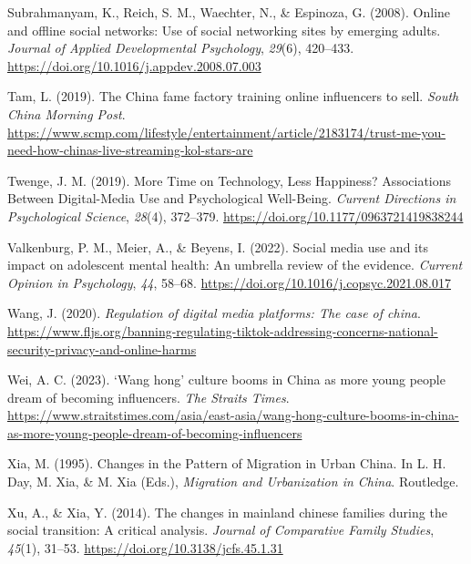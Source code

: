 \documentclass[
  letterpaper,
  DIV=11,
  numbers=noendperiod]{scrartcl}
\newlength{\cslhangindent}
\newenvironment{CSLReferences}[2] %
 {\begin{list}{}{%
  \setlength{\itemindent}{0pt}
  \setlength{\leftmargin}{0pt}
  \setlength{\parsep}{0pt}
  \ifodd #1
   \setlength{\leftmargin}{\cslhangindent}
   \setlength{\itemindent}{-1\cslhangindent}
  \fi
  \setlength{\itemsep}{#2\baselineskip}}}
 {\end{list}}
\begin{document}
\begin{CSLReferences}{1}{0}
Subrahmanyam, K., Reich, S. M., Waechter, N., \& Espinoza, G. (2008).
Online and offline social networks: Use of social networking sites by
emerging adults. \emph{Journal of Applied Developmental Psychology},
\emph{29}(6), 420--433.
\url{https://doi.org/10.1016/j.appdev.2008.07.003}

Tam, L. (2019). The China fame factory training online influencers to
sell. \emph{South China Morning Post}.
\url{https://www.scmp.com/lifestyle/entertainment/article/2183174/trust-me-you-need-how-chinas-live-streaming-kol-stars-are}

Twenge, J. M. (2019). More Time on Technology, Less Happiness?
Associations Between Digital-Media Use and Psychological Well-Being.
\emph{Current Directions in Psychological Science}, \emph{28}(4),
372--379. \url{https://doi.org/10.1177/0963721419838244}

Valkenburg, P. M., Meier, A., \& Beyens, I. (2022). Social media use and
its impact on adolescent mental health: An umbrella review of the
evidence. \emph{Current Opinion in Psychology}, \emph{44}, 58--68.
\url{https://doi.org/10.1016/j.copsyc.2021.08.017}

Wang, J. (2020). \emph{Regulation of digital media platforms: The case
of china}.
\url{https://www.fljs.org/banning-regulating-tiktok-addressing-concerns-national-security-privacy-and-online-harms}

Wei, A. C. (2023). {`}Wang hong{'} culture booms in China as more young
people dream of becoming influencers. \emph{The Straits Times}.
\url{https://www.straitstimes.com/asia/east-asia/wang-hong-culture-booms-in-china-as-more-young-people-dream-of-becoming-influencers}

Xia, M. (1995). Changes in the {Pattern} of {Migration} in {Urban}
{China}. In L. H. Day, M. Xia, \& M. Xia (Eds.), \emph{Migration and
{Urbanization} in {China}}. Routledge.

Xu, A., \& Xia, Y. (2014). The changes in mainland chinese families
during the social transition: A critical analysis. \emph{Journal of
Comparative Family Studies}, \emph{45}(1), 31--53.
\url{https://doi.org/10.3138/jcfs.45.1.31}

\end{CSLReferences}
\end{document}

